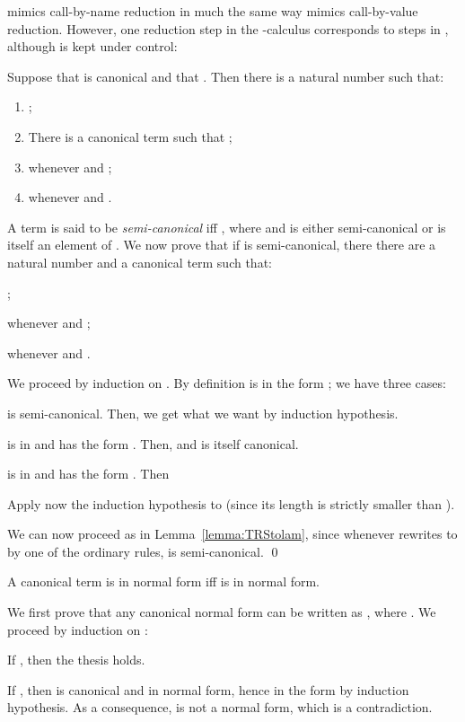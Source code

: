 \documentclass{LMCS}
\newenvironment{varitemize}
{
\begin{list}{\labelitemi}
{\setlength{\itemsep}{0.0mm}
 \setlength{\topsep}{0.0mm}
 \setlength{\parindent}{0.0mm}
 \setlength{\parskip}{0.0mm}
 \setlength{\parsep}{0.0mm}
 \setlength{\partopsep}{0.0mm}
 \setlength{\leftmargin}{15pt}
 \setlength{\labelsep}{5pt}
 \setlength{\labelwidth}{10pt}}}
{
 \end{list} 
}
\newcounter{number}
\begin{document}
 mimics call-by-name reduction in much the same way  mimics call-by-value
reduction. However, one reduction step in the -calculus corresponds to  steps
in , although  is kept under control:
\begin{lem}\label{lemma:simul}
Suppose that  is canonical and that . Then
there is a natural number  such that:
\begin{enumerate}[\em 1.]
\item
  ;
\item
  There is a canonical term  such that ;
\item
   whenever 
  and ;
\item
   whenever 
  and .
\end{enumerate}
\end{lem}
\proof
A term  is said to be \emph{semi-canonical} iff , where
 and  is either semi-canonical or is itself an element
of . We now prove that if  is semi-canonical, there there are a natural
number  and a canonical term  such that:
\begin{varitemize}
\item
  ;
\item
   whenever 
  and ;
\item
   whenever 
  and .
\end{varitemize}
We proceed by induction on . By definition  is 
in the form ; we have three cases:
\begin{varitemize}
\item
   is semi-canonical. Then, we get what we want by induction hypothesis.
\item
   is in  and has the form .
  Then,  and  is itself canonical.
\item
   is in  and has the form . Then
  
  Apply now the induction hypothesis to  (since its length is
  strictly smaller than ).
\end{varitemize}
We can now proceed as in Lemma~\ref{lemma:TRStolam}, since whenever
 rewrites to  by one of the ordinary rules,  is 
semi-canonical.
\qed
\begin{lem}\label{lemma:TRSWnormalform}
A canonical term  is in normal form iff  is in
normal form.
\end{lem}
\proof
We first prove that any canonical normal form  can be written
as , where
. We proceed by induction
on :
\begin{varitemize}
\item
  If ,
  then the thesis holds.
\item
  If , then  is canonical
  and in normal form, hence in the form 
  by induction hypothesis. As a consequence,  is not a normal
  form, which is a contradiction.
\end{varitemize}
\end{document}
